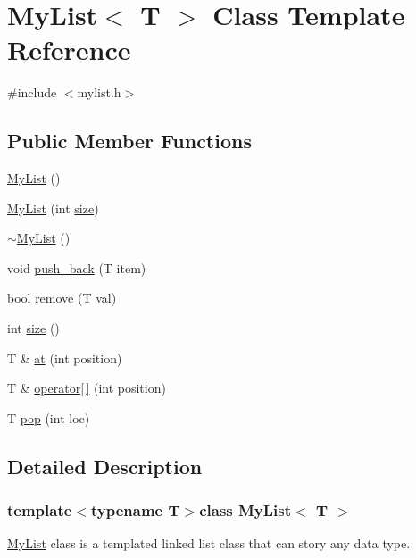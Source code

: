\hypertarget{classMyList}{\section{\-My\-List$<$ \-T $>$ \-Class \-Template \-Reference}
\label{classMyList}
}


{\ttfamily \#include $<$mylist.\-h$>$}

\subsection*{\-Public \-Member \-Functions}
\begin{DoxyCompactItemize}
\item 
\hyperlink{classMyList_aaa11039853c7adb2fbcb770eab8b7305}{\-My\-List} ()
\item 
\hyperlink{classMyList_aa09c011d6d2ee318a1a1f796c9c98533}{\-My\-List} (int \hyperlink{classMyList_a0de1955b845d3f3a7439217507cc335e}{size})
\item 
\hyperlink{classMyList_aa622b9fb3e108b8b8c298ef1996dd256}{$\sim$\-My\-List} ()
\item 
void \hyperlink{classMyList_aae19e199de2bb0f9c72fc2c8b5399c81}{push\-\_\-back} (\-T item)
\item 
bool \hyperlink{classMyList_a7f8a0f53d5153886cb5d6dcca9a07ff3}{remove} (\-T val)
\item 
int \hyperlink{classMyList_a0de1955b845d3f3a7439217507cc335e}{size} ()
\item 
\-T \& \hyperlink{classMyList_a68533f0f9171525f0736603fd5f8a184}{at} (int position)
\item 
\-T \& \hyperlink{classMyList_ade5539cc520eea55a5bf3825c80c9f94}{operator\mbox{[}$\,$\mbox{]}} (int position)
\item 
\-T \hyperlink{classMyList_aca4ff0b35241e2a7e3953b123621e2fb}{pop} (int loc)
\end{DoxyCompactItemize}


\subsection{\-Detailed \-Description}
\subsubsection*{template$<$typename \-T$>$class My\-List$<$ T $>$}

\hyperlink{classMyList}{\-My\-List} class is a templated linked list class that can story any data type. 


